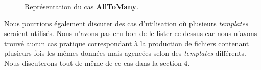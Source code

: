 			\begin{figure}
				\begin{center}
					\caption{Représentation du cas \textbf{AllToMany}.}
					\label{fig:AllToMany}
				\end{center}
			\end{figure}
			
		\begin{note}
			Nous pourrions également discuter des cas d'utilisation où plusieurs \textit{templates} seraient utilisés. Nous n'avons pas cru bon de le lister ce-dessus car nous n'avons trouvé aucun cas pratique correspondant à la production de fichiers contenant plusieurs fois les mêmes données mais agencées selon des \textit{templates} différents. Nous discuterons tout de même de ce cas dans la section 4.
		\end{note}
	